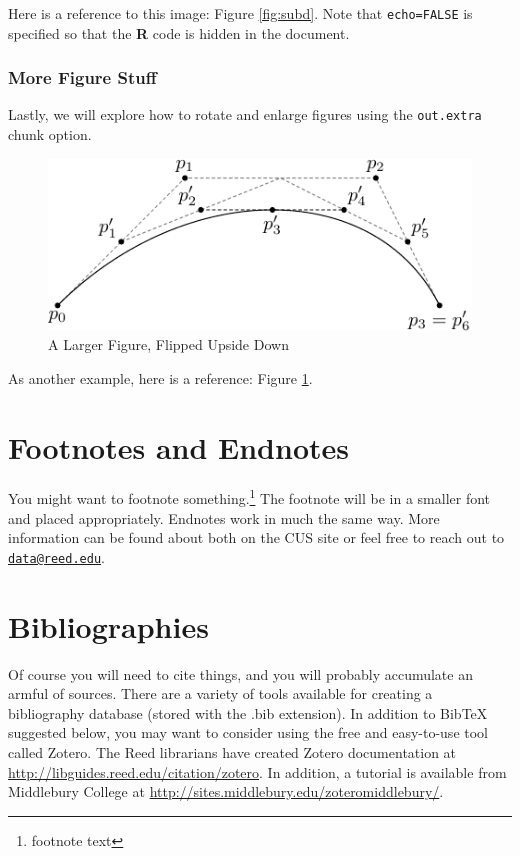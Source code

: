 \documentclass[12pt,twoside]{reedthesis}
\begin{document}
  Here is a reference to this image: Figure \ref{fig:subd}. Note that
  \texttt{echo=FALSE} is specified so that the \textbf{R} code is hidden
  in the document.
  
  \subsubsection{More Figure Stuff}\label{more-figure-stuff}
  
  Lastly, we will explore how to rotate and enlarge figures using the
  \texttt{out.extra} chunk option.
  
  \begin{figure}
  
  {\centering \includegraphics[angle=180, scale=1.1]{figure/subdivision} 
  
  }
  
  \caption[A Larger Figure, Flipped Upside Down]{A Larger Figure, Flipped Upside Down}\label{fig:subd2}
  \end{figure}
  
  As another example, here is a reference: Figure \ref{fig:subd2}.
  
  \section{Footnotes and Endnotes}\label{footnotes-and-endnotes}
  
  You might want to footnote something.\footnote{footnote text} The
  footnote will be in a smaller font and placed appropriately. Endnotes
  work in much the same way. More information can be found about both on
  the CUS site or feel free to reach out to
  \href{mailto:data@reed.edu}{\nolinkurl{data@reed.edu}}.
  
  \section{Bibliographies}\label{bibliographies}
  
  Of course you will need to cite things, and you will probably accumulate
  an armful of sources. There are a variety of tools available for
  creating a bibliography database (stored with the .bib extension). In
  addition to BibTeX suggested below, you may want to consider using the
  free and easy-to-use tool called Zotero. The Reed librarians have
  created Zotero documentation at
  \url{http://libguides.reed.edu/citation/zotero}. In addition, a tutorial
  is available from Middlebury College at
  \url{http://sites.middlebury.edu/zoteromiddlebury/}.
  
\end{document}
